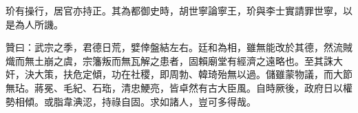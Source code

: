 \begin{pinyinscope}
玠有操行，居官亦持正。其為都御史時，胡世寧論寧王，玠與李士實請罪世寧，以是為人所譏。

贊曰：武宗之季，君德日荒，嬖倖盤結左右。廷和為相，雖無能改於其德，然流賊熾而無土崩之虞，宗籓叛而無瓦解之患者，固賴廟堂有經濟之遠略也。至其誅大奸，決大策，扶危定傾，功在社稷，即周勃、韓琦殆無以過。儲雖蒙物議，而大節無玷。蔣冕、毛紀、石珤，清忠鯁亮，皆卓然有古大臣風。自時厥後，政府日以權勢相傾。或脂韋淟涊，持祿自固。求如諸人，豈可多得哉。


\end{pinyinscope}